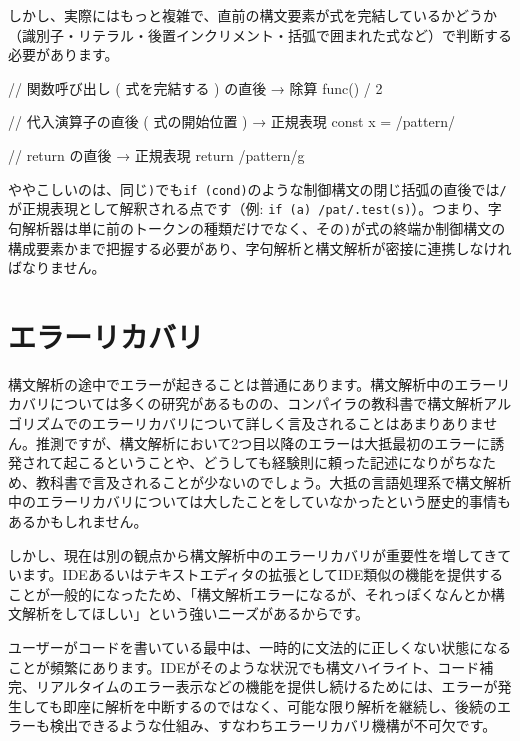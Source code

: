 しかし、実際にはもっと複雑で、直前の構文要素が式を完結しているかどうか（識別子・リテラル・後置インクリメント・括弧で囲まれた式など）で判断する必要があります。

\begin{codescreen}{}
// 関数呼び出し ( 式を完結する ) の直後 → 除算
func() / 2

// 代入演算子の直後 ( 式の開始位置 ) → 正規表現
const x = /pattern/

// return の直後 → 正規表現
return /pattern/g
\end{codescreen}

ややこしいのは、同じ\texttt{)}でも\texttt{if\ (cond)}のような制御構文の閉じ括弧の直後では\texttt{/}が正規表現として解釈される点です（例:
\texttt{if\ (a)\ /pat/.test(s)}）。つまり、字句解析器は単に前のトークンの種類だけでなく、その\texttt{)}が式の終端か制御構文の構成要素かまで把握する必要があり、字句解析と構文解析が密接に連携しなければなりません。

\section{エラーリカバリ}

構文解析の途中でエラーが起きることは普通にあります。構文解析中のエラーリカバリについては多くの研究があるものの、コンパイラの教科書で構文解析アルゴリズムでのエラーリカバリについて詳しく言及されることはあまりありません。推測ですが、構文解析において2つ目以降のエラーは大抵最初のエラーに誘発されて起こるということや、どうしても経験則に頼った記述になりがちなため、教科書で言及されることが少ないのでしょう。大抵の言語処理系で構文解析中のエラーリカバリについては大したことをしていなかったという歴史的事情もあるかもしれません。

しかし、現在は別の観点から構文解析中のエラーリカバリが重要性を増してきています。IDEあるいはテキストエディタの拡張としてIDE類似の機能を提供することが一般的になったため、「構文解析エラーになるが、それっぽくなんとか構文解析をしてほしい」という強いニーズがあるからです。

ユーザーがコードを書いている最中は、一時的に文法的に正しくない状態になることが頻繁にあります。IDEがそのような状況でも構文ハイライト、コード補完、リアルタイムのエラー表示などの機能を提供し続けるためには、エラーが発生しても即座に解析を中断するのではなく、可能な限り解析を継続し、後続のエラーも検出できるような仕組み、すなわちエラーリカバリ機構が不可欠です。

